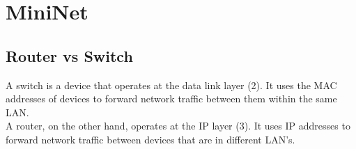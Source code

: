 \section{MiniNet}
\subsection{Router vs Switch}
A switch is a device that operates at the data link layer (2). 
It uses the MAC addresses of devices to forward network traffic between them
within the same LAN.\\
A router, on the other hand, operates at the IP layer (3).
It uses IP addresses to forward network traffic between devices that are in
different LAN's.